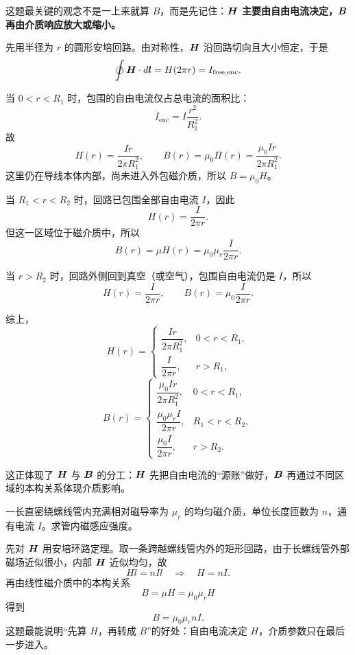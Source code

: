 \documentclass[lang=cn,11pt]{elegantbook}
\begin{document}
\begin{solution}
这题最关键的观念不是一上来就算 \(B\)，而是先记住：\textbf{\(\vb*{H}\) 主要由自由电流决定，\(\vb*{B}\) 再由介质响应放大或缩小。}

先用半径为 \(r\) 的圆形安培回路。由对称性，\(\vb*{H}\) 沿回路切向且大小恒定，于是
\[
\oint \vb*{H}\cdot d\vb*{l}=H(2\pi r)=I_{\mathrm{free,enc}}.
\]

当 \(0<r<R_1\) 时，包围的自由电流仅占总电流的面积比：
\[
I_{\mathrm{enc}}=I\frac{r^2}{R_1^2}.
\]
故
\[
H(r)=\frac{Ir}{2\pi R_1^2},
\qquad
B(r)=\mu_0H(r)=\frac{\mu_0Ir}{2\pi R_1^2}.
\]
这里仍在导线本体内部，尚未进入外包磁介质，所以 \(B=\mu_0H\)。

当 \(R_1<r<R_2\) 时，回路已包围全部自由电流 \(I\)，因此
\[
H(r)=\frac{I}{2\pi r}.
\]
但这一区域位于磁介质中，所以
\[
B(r)=\mu H(r)=\mu_0\mu_r\frac{I}{2\pi r}.
\]

当 \(r>R_2\) 时，回路外侧回到真空（或空气），包围自由电流仍是 \(I\)，所以
\[
H(r)=\frac{I}{2\pi r},
\qquad
B(r)=\mu_0\frac{I}{2\pi r}.
\]

综上，
\[
H(r)=
\begin{cases}
\dfrac{Ir}{2\pi R_1^2}, & 0<r<R_1,\\[6pt]
\dfrac{I}{2\pi r}, & r>R_1,
\end{cases}
\]
\[
B(r)=
\begin{cases}
\dfrac{\mu_0Ir}{2\pi R_1^2}, & 0<r<R_1,\\[6pt]
\dfrac{\mu_0\mu_rI}{2\pi r}, & R_1<r<R_2,\\[6pt]
\dfrac{\mu_0I}{2\pi r}, & r>R_2.
\end{cases}
\]

这正体现了 \(\vb*{H}\) 与 \(\vb*{B}\) 的分工：\(\vb*{H}\) 先把自由电流的“源账”做好，\(\vb*{B}\) 再通过不同区域的本构关系体现介质影响。
\end{solution}

\begin{example}[充满磁介质的长直螺线管]
一长直密绕螺线管内充满相对磁导率为 \(\mu_r\) 的均匀磁介质，单位长度匝数为 \(n\)，通有电流 \(I\)。求管内磁感应强度。
\end{example}

\begin{solution}
先对 \(\vb*{H}\) 用安培环路定理。取一条跨越螺线管内外的矩形回路，由于长螺线管外部磁场近似很小，内部 \(\vb*{H}\) 近似均匀，故
\[
Hl=nIl
\quad\Longrightarrow\quad
H=nI.
\]
再由线性磁介质中的本构关系
\[
B=\mu H=\mu_0\mu_r H
\]
得到
\[
\boxed{
B=\mu_0\mu_r nI
}.
\]
这题最能说明“先算 \(H\)，再转成 \(B\)”的好处：自由电流决定 \(H\)，介质参数只在最后一步进入。
\end{solution}
\end{document}
